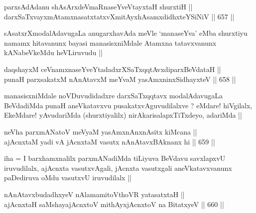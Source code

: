 \begin{shl}
parxsAdAdanu shAsArxdeVmaRnaseYveVtayxtaH shurxtiH || \\
darxSaTxvayxmAtamxnasatxtatxvXmitAyxhAsamxdidhxteYSiNiV ||  657 ||  
\end{shl}

\begin{artha}
sAsatxrXmodalAdavugaLa anugarxhavAda meVle `manaseYva' eMba shurxtiyu
namamx hitavanunx bayasi manasisxniMdale Atamxna tatavxvanunx
kANabeVkeMdu heVLiruvudu ||
\end{artha}


\begin{shl}
daqshayxM ceVnamxnaseYveYtadadxrXSaTxqqtAvxdiparxBeVdataH || \\
punaH parxsakatxM nAnAtavxM meYvaM yasAmxninxSidhayxteV ||  658 ||  
\end{shl}

\begin{artha}
manasisxniMdale noVDuvudidadxre darxSaTxqqtavx modalAdavugaLa
BeVdadiMda punaH aneVkatavxvu pusakatxvAguvudilalxve ? eMdare!
hiVgilalx, EkeMdare! yAvudariMda (shurxtiyalilx)
nirAkarisalapxTiTxdeyo, adariMda ||
\end{artha}


\begin{shl}
neVha parxmANatoV meVyaM yasAmxnAnxnA\s sitx kiMcana || \\
ajAcnxtaM yadi vA jAcnxtaM vasutx nAnAtavxBAknanx hi ||  659 ||  
\end{shl}

\begin{artha}
iha = I barxhamxnalilx parxmANadiMda tiLiyuva BeVdavu savxlapxvU
iruvudilalx, ajAcnxta vasutxvAgali, jAcnxta vasutxgali
aneVkatavxvanunx paDediruva oMdu vasutxvU iruvudilalx ||
\end{artha}


\begin{shl}
nAnAtavxbudadhxyeV nAlamamitoV\s thoVR yatasatxtaH || \\
ajAcnxtaH saMshayajAcnxtoV mithAyxjAcnxtoV na BitatxyeV ||  660 ||  
\end{shl}

